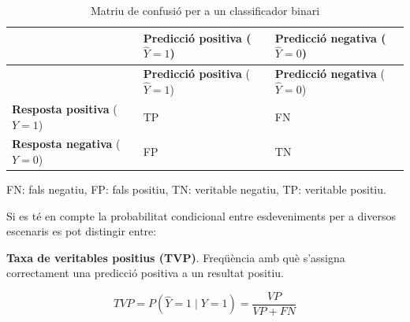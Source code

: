 \documentclass[CAT]{TFUOC}%
\begin{document}
\begin{longtable}[]{@{}
  >{\raggedright\arraybackslash}p{}
  >{\raggedright\arraybackslash}p{}
  >{\raggedright\arraybackslash}p{}@{}}
\caption{Matriu de confusió per a un classificador binari}\label{tab:taula2-1}\tabularnewline
\toprule\noalign{}
\begin{minipage}[b]{\linewidth}\raggedright
\end{minipage} & \begin{minipage}[b]{\linewidth}\raggedright
\textbf{Predicció positiva} (\(\hat Y = 1\))
\end{minipage} & \begin{minipage}[b]{\linewidth}\raggedright
\textbf{Predicció negativa} (\(\hat Y = 0\))
\end{minipage} \\
\midrule\noalign{}
\endfirsthead
\toprule\noalign{}
\begin{minipage}[b]{\linewidth}\raggedright
\end{minipage} & \begin{minipage}[b]{\linewidth}\raggedright
\textbf{Predicció positiva} (\(\hat Y = 1\))
\end{minipage} & \begin{minipage}[b]{\linewidth}\raggedright
\textbf{Predicció negativa} (\(\hat Y = 0\))
\end{minipage} \\
\midrule\noalign{}
\endhead
\bottomrule\noalign{}
\endlastfoot
\textbf{Resposta positiva} (\(Y = 1\)) & TP & FN \\
\textbf{Resposta negativa} (\(Y = 0\)) & FP & TN \\
\end{longtable}

\small FN: fals negatiu, FP: fals positiu, TN: veritable negatiu, TP: veritable positiu.

\bigskip

Si es té en compte la probabilitat condicional entre esdeveniments per a diversos escenaris es pot distingir entre:

\bigskip

\textbf{Taxa de veritables positius (TVP)}. Freqüència amb què s'assigna correctament una predicció positiva a un resultat positiu.

\begin{equation}
TVP = P(\hat Y = 1 \mid Y = 1) = \frac{VP}{VP + FN}
\end{equation}
\end{document}
